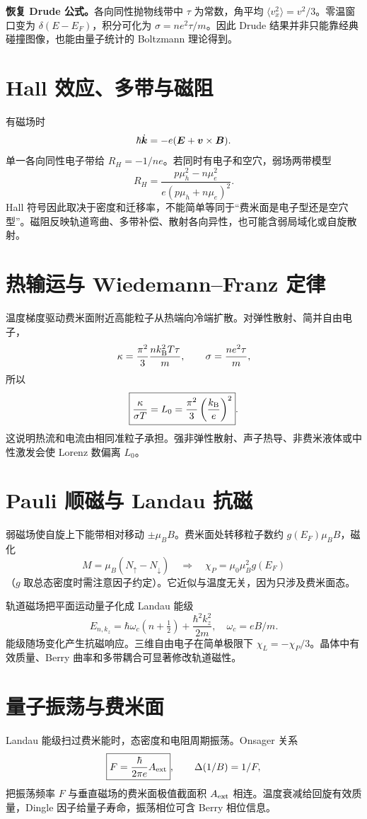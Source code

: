 \begin{examplebox}
\textbf{恢复 Drude 公式。}各向同性抛物线带中 $\tau$ 为常数，角平均
$\langle v_x^2\rangle=v^2/3$。零温窗口变为
$\delta(E-E_F)$，积分可化为
$\sigma=ne^2\tau/m$。因此 Drude 结果并非只能靠经典碰撞图像，也能由量子统计的 Boltzmann 理论得到。
\end{examplebox}

\section{Hall 效应、多带与磁阻}
有磁场时
\[
\hbar\dot{\bm{k}}=-e(\bm{E}+\bm{v}\times\bm{B}).
\]
单一各向同性电子带给
$R_H=-1/ne$。若同时有电子和空穴，弱场两带模型
\[
R_H=\frac{p\mu_h^2-n\mu_e^2}
{e(p\mu_h+n\mu_e)^2}.
\]
Hall 符号因此取决于密度和迁移率，不能简单等同于“费米面是电子型还是空穴型”。磁阻反映轨道弯曲、多带补偿、散射各向异性，也可能含弱局域化或自旋散射。

\section{热输运与 Wiedemann--Franz 定律}
温度梯度驱动费米面附近高能粒子从热端向冷端扩散。对弹性散射、简并自由电子，
\[
\kappa=\frac{\pi^2}{3}\frac{nk_{\mathrm B}^2T\tau}{m},
\qquad \sigma=\frac{ne^2\tau}{m},
\]
所以
\[
\boxed{\frac{\kappa}{\sigma T}=L_0=
\frac{\pi^2}{3}\left(\frac{k_{\mathrm B}}{e}\right)^2}.
\]
这说明热流和电流由相同准粒子承担。强非弹性散射、声子热导、非费米液体或中性激发会使 Lorenz 数偏离 $L_0$。

\section{Pauli 顺磁与 Landau 抗磁}
弱磁场使自旋上下能带相对移动 $\pm\mu_BB$。费米面处转移粒子数约
$g(E_F)\mu_BB$，磁化
\[
M=\mu_B(N_\uparrow-N_\downarrow)
\quad\Rightarrow\quad
\chi_P=\mu_0\mu_B^2g(E_F)
\]
（$g$ 取总态密度时需注意因子约定）。它近似与温度无关，因为只涉及费米面态。

轨道磁场把平面运动量子化成 Landau 能级
\[
E_{n,k_z}=\hbar\omega_c(n+\tfrac12)
+\frac{\hbar^2k_z^2}{2m},
\quad\omega_c=eB/m.
\]
能级随场变化产生抗磁响应。三维自由电子在简单极限下
$\chi_L=-\chi_P/3$。晶体中有效质量、Berry 曲率和多带耦合可显著修改轨道磁性。

\section{量子振荡与费米面}
Landau 能级扫过费米能时，态密度和电阻周期振荡。Onsager 关系
\[
\boxed{F=\frac{\hbar}{2\pi e}A_{\rm ext}},\qquad
\Delta(1/B)=1/F,
\]
把振荡频率 $F$ 与垂直磁场的费米面极值截面积 $A_{\rm ext}$ 相连。温度衰减给回旋有效质量，Dingle 因子给量子寿命，振荡相位可含 Berry 相位信息。

